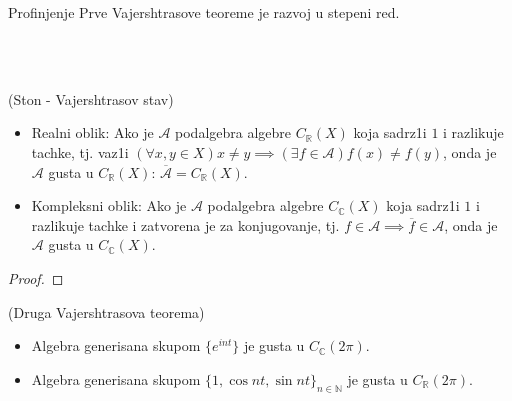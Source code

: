 \documentclass[a4paper,12pt]{article}
\newcommand{\NN}{\mathbb{N}}
\newcommand{\RR}{\mathbb{R}}
\newcommand{\CC}{\mathbb{C}}
\begin{document}
\begin{nap}
Profinjenje Prve Vajershtrasove teoreme je razvoj u stepeni red.
\end{nap}
\\ \\
\begin{tma}
(Ston - Vajershtrasov stav)
\begin{itemize}
\item Realni oblik: Ako je $\mathcal{A}$ podalgebra algebre $C_{\RR}(X)$ koja sadrz1i $1$ i razlikuje tachke, tj. vaz1i $(\forall x,y \in X) x \ne y \implies (\exists f \in \mathcal{A}) f(x) \ne f(y)$, onda je $\mathcal{A}$ gusta u $C_{\RR}(X)$: $\overline{\mathcal{A}} = C_{\RR}(X)$.
\item Kompleksni oblik: Ako je $\mathcal{A}$ podalgebra algebre $C_{\CC}(X)$ koja sadrz1i $1$ i razlikuje tachke i zatvorena je za kon\-jugovanje, tj. $f \in \mathcal{A} \implies \overline{f} \in \mathcal{A}$, onda je $\mathcal{A}$ gusta u $C_{\CC}(X)$.
\end{itemize}
\end{tma}
\begin{proof}

\end{proof}

\begin{posl}
(Druga Vajershtrasova teorema)
\begin{itemize}
\item Algebra generisana skupom $\{e^{i n t}\}$ je gusta u $C_{\CC}(2 \pi)$.
\item  Algebra generisana skupom ${\{1, \cos nt, \sin nt \}}_{n \in \NN}$ je gusta u $C_{\RR}(2 \pi)$.
\end{itemize}
\end{posl}
\end{document}
